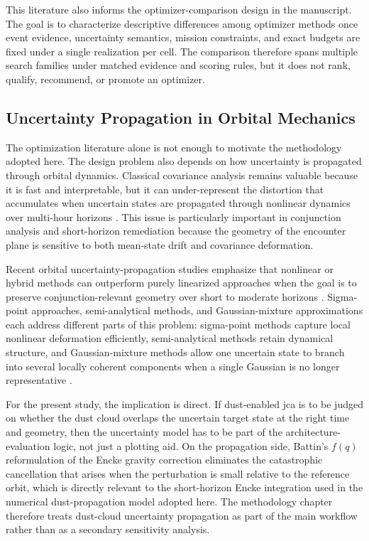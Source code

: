 This literature also informs the optimizer-comparison design in the manuscript. The goal is to characterize descriptive differences among optimizer methods once event evidence, uncertainty semantics, mission constraints, and exact budgets are fixed under a single realization per cell. The comparison therefore spans multiple search families under matched evidence and scoring rules, but it does not rank, qualify, recommend, or promote an optimizer.

\subsection{Uncertainty Propagation in Orbital Mechanics}
The optimization literature alone is not enough to motivate the methodology adopted here. The design problem also depends on how uncertainty is propagated through orbital dynamics. Classical covariance analysis remains valuable because it is fast and interpretable, but it can under-represent the distortion that accumulates when uncertain states are propagated through nonlinear dynamics over multi-hour horizons \cite{LUO201723}. This issue is particularly important in conjunction analysis and short-horizon remediation because the geometry of the encounter plane is sensitive to both mean-state drift and covariance deformation.

Recent orbital uncertainty-propagation studies emphasize that nonlinear or hybrid methods can outperform purely linearized approaches when the goal is to preserve conjunction-relevant geometry over short to moderate horizons \cite{KhatriScheeres2023}. Sigma-point approaches, semi-analytical methods, and Gaussian-mixture approximations each address different parts of this problem: sigma-point methods capture local nonlinear deformation efficiently, semi-analytical methods retain dynamical structure, and Gaussian-mixture methods allow one uncertain state to branch into several locally coherent components when a single Gaussian is no longer representative \cite{unscented_transform,KulikLeGrand2026}.

For the present study, the implication is direct. If dust-enabled \gls{jca} is to be judged on whether the dust cloud overlaps the uncertain target state at the right time and geometry, then the uncertainty model has to be part of the architecture-evaluation logic, not just a plotting aid. On the propagation side, Battin's \(f(q)\) reformulation of the Encke gravity correction \cite{battin1999} eliminates the catastrophic cancellation that arises when the perturbation is small relative to the reference orbit, which is directly relevant to the short-horizon Encke integration used in the numerical dust-propagation model adopted here. The methodology chapter therefore treats dust-cloud uncertainty propagation as part of the main workflow rather than as a secondary sensitivity analysis.

